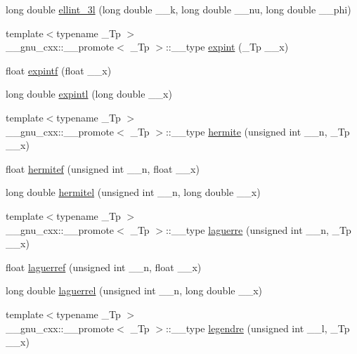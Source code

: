 \begin{DoxyCompactItemize}
\item 
long double \hyperlink{group__tr29124__math__spec__func_gaa8c0e5864df8769021a7f3e21a30c5d2}{ellint\+\_\+3l} (long double \+\_\+\+\_\+k, long double \+\_\+\+\_\+nu, long double \+\_\+\+\_\+phi)
\item 
{\footnotesize template$<$typename \+\_\+\+Tp $>$ }\\\+\_\+\+\_\+gnu\+\_\+cxx\+::\+\_\+\+\_\+promote$<$ \+\_\+\+Tp $>$\+::\+\_\+\+\_\+type \hyperlink{group__tr29124__math__spec__func_ga88ba17f5d050a6973ca4db1bf6e90590}{expint} (\+\_\+\+Tp \+\_\+\+\_\+x)
\item 
float \hyperlink{group__tr29124__math__spec__func_ga5842816f6eed2594e0a327df4e4a2a47}{expintf} (float \+\_\+\+\_\+x)
\item 
long double \hyperlink{group__tr29124__math__spec__func_ga1329130b32328d0666e290ee5931fa4f}{expintl} (long double \+\_\+\+\_\+x)
\item 
{\footnotesize template$<$typename \+\_\+\+Tp $>$ }\\\+\_\+\+\_\+gnu\+\_\+cxx\+::\+\_\+\+\_\+promote$<$ \+\_\+\+Tp $>$\+::\+\_\+\+\_\+type \hyperlink{group__tr29124__math__spec__func_ga97632b8bf77c323b2369e8d327965bdf}{hermite} (unsigned int \+\_\+\+\_\+n, \+\_\+\+Tp \+\_\+\+\_\+x)
\item 
float \hyperlink{group__tr29124__math__spec__func_ga94dae7444bb349e33057a92932db8abe}{hermitef} (unsigned int \+\_\+\+\_\+n, float \+\_\+\+\_\+x)
\item 
long double \hyperlink{group__tr29124__math__spec__func_ga21f8e312ee3e65286f86bf141b0f32e0}{hermitel} (unsigned int \+\_\+\+\_\+n, long double \+\_\+\+\_\+x)
\item 
{\footnotesize template$<$typename \+\_\+\+Tp $>$ }\\\+\_\+\+\_\+gnu\+\_\+cxx\+::\+\_\+\+\_\+promote$<$ \+\_\+\+Tp $>$\+::\+\_\+\+\_\+type \hyperlink{group__tr29124__math__spec__func_gacae65579b397fddcd27954380d364a58}{laguerre} (unsigned int \+\_\+\+\_\+n, \+\_\+\+Tp \+\_\+\+\_\+x)
\item 
float \hyperlink{group__tr29124__math__spec__func_gada763419b0e21b38e38daa8b6eb56a8c}{laguerref} (unsigned int \+\_\+\+\_\+n, float \+\_\+\+\_\+x)
\item 
long double \hyperlink{group__tr29124__math__spec__func_gaaf8b141edf9163b37ea4f2ed3e0191fc}{laguerrel} (unsigned int \+\_\+\+\_\+n, long double \+\_\+\+\_\+x)
\item 
{\footnotesize template$<$typename \+\_\+\+Tp $>$ }\\\+\_\+\+\_\+gnu\+\_\+cxx\+::\+\_\+\+\_\+promote$<$ \+\_\+\+Tp $>$\+::\+\_\+\+\_\+type \hyperlink{group__tr29124__math__spec__func_gaf6eac7fcb98e25b8f3f7d1b95fa7add8}{legendre} (unsigned int \+\_\+\+\_\+l, \+\_\+\+Tp \+\_\+\+\_\+x)

\end{DoxyCompactItemize}
